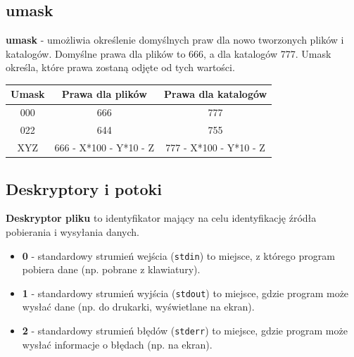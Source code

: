 \documentclass{article}
\begin{document}
\subsection{umask}
\textbf{umask} - umożliwia określenie domyślnych praw dla nowo tworzonych plików i katalogów.
Domyślne prawa dla plików to 666, a dla katalogów 777. Umask określa, które prawa zostaną odjęte od tych wartości.
\begin{table}[ht]
\centering
\begin{tabular}{|c|c|c|}
\hline
\textbf{Umask} & \textbf{Prawa dla plików} & \textbf{Prawa dla katalogów} \\
\hline
000 & 666 & 777 \\
\hline
022 & 644 & 755 \\
\hline
XYZ & 666 - X*100 - Y*10 - Z & 777 - X*100 - Y*10 - Z \\
\hline
\end{tabular}
\end{table}

\subsection{Deskryptory i potoki}
\textbf{Deskryptor pliku} to identyfikator mający na celu identyfikację źródła pobierania i wysyłania danych.

\begin{itemize}
    \item \textbf{0} - standardowy strumień wejścia (\texttt{stdin}) to miejsce, z którego program pobiera dane (np. pobrane z klawiatury).
    \item \textbf{1} - standardowy strumień wyjścia (\texttt{stdout}) to miejsce, gdzie program może wysłać dane (np. do drukarki, wyświetlane na ekran).
    \item \textbf{2} - standardowy strumień błędów (\texttt{stderr}) to miejsce, gdzie program może wysłać informacje o błędach (np. na ekran).
\end{itemize}
\end{document}

